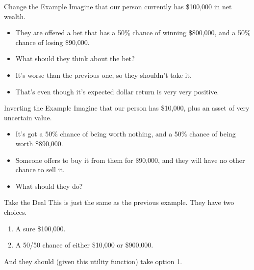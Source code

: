 \documentclass[
  ignorenonframetext,
]{beamer}
\providecommand{\tightlist}{%
  \setlength{\itemsep}{0pt}\setlength{\parskip}{0pt}}
\renewcommand{\,}{\text{, }}
\begin{document}
\begin{frame}{Change the Example}
\protect\hypertarget{change-the-example}{}
Imagine that our person currently has \$100,000 in net wealth.

\begin{itemize}
\tightlist
\item
  They are offered a bet that has a 50\% chance of winning \$800,000,
  and a 50\% chance of losing \$90,000.
\item
  What should they think about the bet? \pause
\item
  It's worse than the previous one, so they shouldn't take it.
\item
  That's even though it's expected dollar return is very very positive.
\end{itemize}
\end{frame}

\begin{frame}{Inverting the Example}
\protect\hypertarget{inverting-the-example}{}
Imagine that our person has \$10,000, plus an asset of very uncertain
value.

\begin{itemize}
\tightlist
\item
  It's got a 50\% chance of being worth nothing, and a 50\% chance of
  being worth \$890,000.
\item
  Someone offers to buy it from them for \$90,000, and they will have no
  other chance to sell it.
\item
  What should they do?
\end{itemize}
\end{frame}

\begin{frame}{Take the Deal}
\protect\hypertarget{take-the-deal}{}
This is just the same as the previous example. They have two choices.

\begin{enumerate}
\tightlist
\item
  A sure \$100,000.
\item
  A 50/50 chance of either \$10,000 or \$900,000.
\end{enumerate}

And they should (given this utility function) take option 1.
\end{frame}
\end{document}
